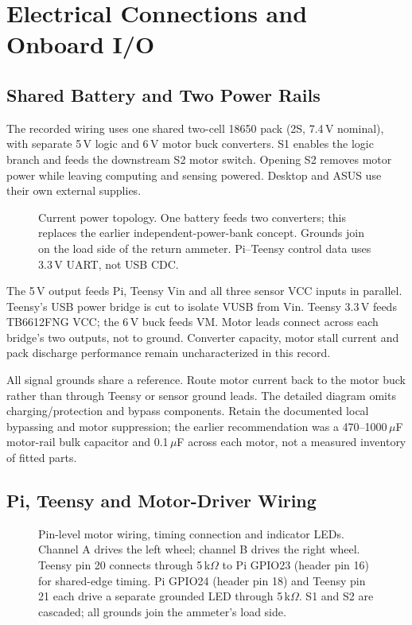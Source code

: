 \clearpage
\section{Electrical Connections and Onboard I/O}
\label{sec:electrical-design}
\subsection{Shared Battery and Two Power Rails}
The recorded wiring uses one shared two-cell 18650 pack (2S, 7.4\,V nominal), with separate 5\,V logic and 6\,V motor buck converters. S1 enables the logic branch and feeds the downstream S2 motor switch. Opening S2 removes motor power while leaving computing and sensing powered. Desktop and ASUS use their own external supplies.

\begin{figure}[H]
\centering

\caption{Current power topology. One battery feeds two converters; this replaces the earlier independent-power-bank concept. Grounds join on the load side of the return ammeter. Pi--Teensy control data uses 3.3\,V UART, not USB CDC.}
\label{fig:power_topology}
\end{figure}

The 5\,V output feeds Pi, Teensy Vin and all three sensor VCC inputs in parallel. Teensy's USB power bridge is cut to isolate VUSB from Vin. Teensy 3.3\,V feeds TB6612FNG VCC; the 6\,V buck feeds VM. Motor leads connect across each bridge's two outputs, not to ground. Converter capacity, motor stall current and pack discharge performance remain uncharacterized in this record.

All signal grounds share a reference. Route motor current back to the motor buck rather than through Teensy or sensor ground leads. The detailed diagram omits charging/protection and bypass components. Retain the documented local bypassing and motor suppression; the earlier recommendation was a 470--1000\,$\mu$F motor-rail bulk capacitor and 0.1\,$\mu$F across each motor, not a measured inventory of fitted parts.

\clearpage
\subsection{Pi, Teensy and Motor-Driver Wiring}
\begin{figure}[H]
\centering
\resizebox{.86\linewidth}{!}{}
\caption{Pin-level motor wiring, timing connection and indicator LEDs. Channel A drives the left wheel; channel B drives the right wheel. Teensy pin 20 connects through 5\,k$\Omega$ to Pi GPIO23 (header pin 16) for shared-edge timing. Pi GPIO24 (header pin 18) and Teensy pin 21 each drive a separate grounded LED through 5\,k$\Omega$. S1 and S2 are cascaded; all grounds join the ammeter's load side.}
\label{fig:pi-teensy-tb6612-wiring}
\end{figure}

